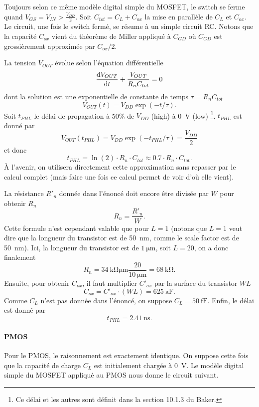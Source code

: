 \documentclass[frenchb,DIV=14]{scrartcl}
\begin{document}
Toujours selon ce même modèle digital simple du MOSFET, le switch se ferme
quand $V_{GS} = V_{IN} > \frac{V_{DD}}{2}$.
Soit $C_{tot} = C_L + C_{ox}$ la mise en parallèle de $C_L$ et $C_{ox}$. Le
circuit, une fois le switch fermé, se résume à un simple circuit RC.
Notons que la capacité $C_{ox}$ vient du théorème de Miller appliqué
à $C_{GD}$ où $C_{GD}$ est grossièrement approximée par $C_{ox}/2$.

\begin{center}
\end{center}

La tension $V_{OUT}$ évolue selon l'équation différentielle
\[ \frac{\operatorname{d}\! V_{OUT}}{\operatorname{d}\! t} + \frac{V_{OUT}}{R_nC_{tot}} = 0 \]
dont la solution est une exponentielle de constante de temps $\tau = R_nC_{tot}$
\[ V_{OUT}(t) = V_{DD}\exp\left(-t/\tau\right).\]
Soit $t_{PHL}$ le délai de propagation à 50\% de $V_{DD}$ (high) à \SI{0}{\volt} (low)
\footnote{Ce délai et les autres sont définit dans la section 10.1.3 du Baker.}.
$t_{PHL}$ est donné par
\[ V_{OUT}(t_{PHL}) = V_{DD}\exp\left(-t_{PHL}/\tau\right) = \frac{V_{DD}}{2} \]
et donc
\[ t_{PHL} = \ln(2)\cdot R_n\cdot C_{tot} \approx 0.7\cdot R_n\cdot C_{tot}. \]
\`{A} l'avenir, on utilisera directement cette approximation sans repasser par le calcul
complet (mais faire une fois ce calcul permet de voir d'où elle vient).

La résistance $R'_n$ donnée dans l'énoncé doit encore être divisée par $W$ pour
obtenir $R_n$
\[ R_n = \frac{R'_n}{W}. \]
Cette formule n'est cependant valable que pour $L=1$ (notons que $L=1$ veut
dire que la longueur du transistor est de \SI{50}{\nano\meter}, comme le
scale factor est de \SI{50}{\nano\meter}). Ici, la longueur du transistor
est de $\SI{1}{\micro\meter}$, soit $L=20$, on a donc finalement
\[ R_n = \SI{34}{\kilo\ohm\micro\meter}\frac{20}{\SI{10}{\micro\meter}} =
\SI{68}{\kilo\ohm}. \]
Ensuite, pour obtenir $C_{ox}$, il faut multiplier $C'_{ox}$ par la surface du
transistor $WL$
\[ C_{ox} = C'_{ox}\cdot(WL) = \SI{625}{\atto\farad}. \]
Comme $C_L$ n'est pas donnée dans l'énoncé, on suppose $C_L = \SI{50}{\femto\farad}$.
Enfin, le délai est donné par
\[ t_{PHL} = \SI{2.41}{\nano\second}. \]

\paragraph{PMOS}
Pour le PMOS, le raisonnement est exactement identique. On suppose cette fois que la
capacité de charge $C_L$ est initialement chargée à \SI{0}{\volt}. Le modèle digital
simple du MOSFET appliqué au PMOS nous donne le circuit suivant.
\end{document}
